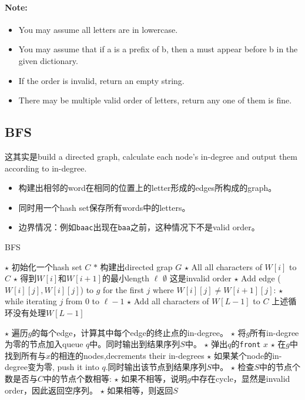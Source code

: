 \paragraph{Note:}

\begin{itemize}
\item You may assume all letters are in lowercase.
\item You may assume that if a is a prefix of b, then a must appear before b in the given dictionary.
\item If the order is invalid, return an empty string.
\item There may be multiple valid order of letters, return any one of them is fine.
\end{itemize}
\subsection{BFS}
这其实是build a directed graph, calculate each node's in-degree and output them according to in-degree.
\begin{itemize}
\item 构建出相邻的word在相同的位置上的letter形成的edges所构成的graph。
\item 同时用一个hash set保存所有words中的letters。
\item 边界情况：例如\texttt{baac}出现在\texttt{baa}之前，这种情况下不是valid order。
\end{itemize}
\setcounter{algorithm}{0}
\begin{algorithm}[H]
\caption{BFS}
\begin{algorithmic}[1]
\State $\star$ 初始化一个hash set $C$
\State $\ast$ 构建出directed grap $G$
\State $\star$ All all characters of $W[i]$ to $C$
\State $\star$ 得到$W[i]$和$W[i+1]$的最小length $\ell$
\State \Return $\emptyset$ \Comment 这是invalid order
\EndIf
\EndIf
\State $\star$ Add edge ($W[i][j], W[i][j]$) to $g$ for the first $j$ where $W[i][j]\neq W[i+1][j]$: 
\State $\star$ while iterating $j$ from 0 to $\ell-1$
\EndFor
\State $\star$ Add all characters of $W[L-1]$ to $C$ \Comment 上述循环没有处理$W[L-1]$
\end{algorithmic}
\end{algorithm}
\begin{algorithm}[H]
\begin{algorithmic}[1]
\State $\star$ 遍历$g$的每个edge，计算其中每个edge的终止点的in-degree。
\State $\star$ 将$g$所有in-degree为零的节点加入queue $q$中。同时输出到结果序列$S$中。
\State $\star$ 弹出$q$的\texttt{front} $x$
\State $\star$ 在$g$中找到所有与$x$的相连的nodes,decrements their in-degrees
\State $\star$ 如果某个node的in-degree变为零, push it into $q$.同时输出该节点到结果序列$S$中。
\EndWhile
\State $\star$ 检查$S$中的节点个数是否与$C$中的节点个数相等: 
\State $\star$ 如果不相等，说明$g$中存在cycle，显然是invalid order，因此返回空序列。
\State $\star$ 如果相等，则返回$S$
\EndProcedure
\end{algorithmic}
\end{algorithm}

